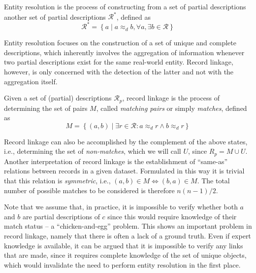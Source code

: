 \begin{definition}
    Entity resolution is the process of constructing from a set of partial descriptions another set of partial descriptions $\mathcal{R}^{*}$, defined as
    \begin{equation*}
        \mathcal{R}^{*} = \left\{ a \mid a \approx_{d} b, \forall{a}, \exists{b} \in \mathcal{R} \right\}
    \end{equation*}
\end{definition}

Entity resolution focuses on the construction of a set of unique and complete descriptions, which inherently involves the aggregation of information whenever two partial descriptions exist for the same real-world entity.
Record linkage, however, is only concerned with the detection of the latter and not with the aggregation itself.

\begin{definition}
    Given a set of (partial) descriptions $\mathcal{R}_{p}$, record linkage is the process of determining the set of pairs $M$, called \emph{matching pairs} or simply \emph{matches}, defined as
    \begin{equation}
        M = \left\{ (a, b) \mid \exists{r} \in \mathcal{R}: a \approx_{d} r \wedge b \approx_{d} r \right\}
    \end{equation}
\end{definition}

Record linkage can also be accomplished by the complement of the above states, i.e., determining the set of \emph{non-matches}, which we will call $U$, since $R_{p} = M \cup U$.
Another interpretation of record linkage is the establishment of ``same-as'' relations between records in a given dataset.
Formulated in this way it is trivial that this relation is \emph{symmetric}, i.e., $(a, b) \in M \Leftrightarrow (b, a) \in M$.
The total number of possible matches to be considered is therefore $n(n-1)/2$.

Note that we assume that, in practice, it is impossible to verify whether both $a$ and $b$ are partial descriptions of $c$ since this would require knowledge of their match status -- a ``chicken-and-egg'' problem.
This shows an important problem in record linkage, namely that there is often a lack of a ground truth.
Even if expert knowledge is available, it can be argued that it is impossible to verify any links that are made, since it requires complete knowledge of the set of unique objects, which would invalidate the need to perform entity resolution in the first place.

